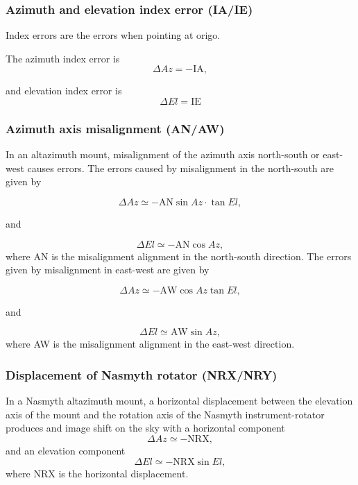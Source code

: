 \subsubsection{Azimuth and elevation index error (IA/IE)}
Index errors are the errors when pointing at origo.

The azimuth index error is 
\begin{equation}
    \Delta Az = -\text{IA},
\end{equation}

and elevation index error is
\begin{equation}\label{eq:pmodel_ie}
    \Delta El = \text{IE}
\end{equation}

\subsubsection{Azimuth axis misalignment (AN/AW)} 

In an altazimuth mount, misalignment of the azimuth axis north-south or east-west causes errors.
The errors caused by misalignment in the north-south are given by

\begin{equation}
    \Delta Az \simeq - \text{AN} \sin{Az} \cdot \tan{El},
\end{equation}

and

\begin{equation}
    \Delta El \simeq - \text{AN} \cos{Az},
\end{equation}
where AN is the misalignment alignment in the north-south direction.
The errors given by misalignment in east-west are given by

\begin{equation}
    \Delta Az \simeq - \text{AW} \cos{Az} \tan{El},
\end{equation}

and

\begin{equation}
    \Delta El \simeq \text{AW} \sin{Az},
\end{equation}
where AW is the misalignment alignment in the east-west direction.

\subsubsection{Displacement of Nasmyth rotator (NRX/NRY)}
In a Nasmyth altazimuth mount, a horizontal displacement between the elevation axis of the mount and the rotation axis of the Nasmyth instrument-rotator produces
and image shift on the sky with a horizontal component
\begin{equation}
    \Delta Az \simeq - \text{NRX},
\end{equation}
and an elevation component
\begin{equation}
    \Delta El \simeq - \text{NRX} \sin{El},
\end{equation}
where NRX is the horizontal displacement.

